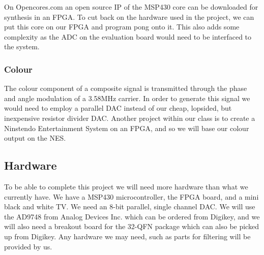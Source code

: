 On Opencores.com an open source IP of the MSP430 core can be downloaded for
synthesis in an FPGA. To cut back on the hardware used in the project, we can
put this core on our FPGA and program pong onto it. This also adds some
complexity as the ADC on the evaluation board would need to be interfaced to the
system.

\subsubsection*{Colour}

The colour component of a composite signal is transmitted through the phase and
angle modulation of a 3.58MHz carrier. In order to generate this signal we would
need to employ a parallel DAC instead of our cheap, lopsided, but inexpensive
resistor divider DAC. Another project within our class is to create a Ninstendo
Entertainment System on an FPGA, and so we will base our colour output on the
NES.


\subsection*{Hardware}

To be able to complete this project we will need more hardware than what we 
currently have. We have a MSP430 microcontroller, the FPGA board, and a mini
black and white TV. We need an 8-bit parallel, single channel DAC. We will use
the AD9748 from Analog Devices Inc. which can be ordered from Digikey, and we
will also need a breakout board for the 32-QFN package which can also be picked
up from Digikey. Any hardware we may need, such as parts for filtering will be
provided by us.
